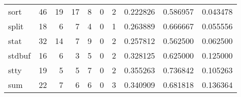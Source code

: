 \begin{tabular}{lrrrrrrrrr}
sort      &                                      46 &                                                 19 &                                                 17 &                                                  8 &                                                  0 &                                                  2 &                                           0.222826 &                               0.586957 &                             0.043478 \\
split     &                                      18 &                                                  6 &                                                  7 &                                                  4 &                                                  0 &                                                  1 &                                           0.263889 &                               0.666667 &                             0.055556 \\
stat      &                                      32 &                                                 14 &                                                  7 &                                                  9 &                                                  0 &                                                  2 &                                           0.257812 &                               0.562500 &                             0.062500 \\
stdbuf    &                                      16 &                                                  6 &                                                  3 &                                                  5 &                                                  0 &                                                  2 &                                           0.328125 &                               0.625000 &                             0.125000 \\
stty      &                                      19 &                                                  5 &                                                  5 &                                                  7 &                                                  0 &                                                  2 &                                           0.355263 &                               0.736842 &                             0.105263 \\
sum       &                                      22 &                                                  7 &                                                  6 &                                                  6 &                                                  0 &                                                  3 &                                           0.340909 &                               0.681818 &                             0.136364 \\

\end{tabular}
